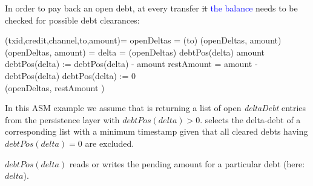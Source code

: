 In order to pay back an open debt, at every transfer \st{it} \textcolor{blue}{the balance} needs to be checked for possible debt clearances:

\begin{asm}
	(txid,credit,channel,to,amount)=\+
		\LET openDeltas = (to)\+
			(openDeltas, amount)\dec\-
	\WHERE \+
		(openDeltas, amount) =\+
		\LET delta = (openDeltas)\+
			\IF debtPos(delta) \ge amount \THEN\+
				debtPos(delta) := debtPos(delta) - amount\-
			\ELSE\+
				\LET restAmount = amount - debtPos(delta)\+
					debtPos(delta) := 0\SEQ\\
					(openDeltas, restAmount )\dec\dec\dec\-
\end{asm}


In this ASM example we assume that  is returning a list of open \textit{deltaDebt} entries from the persistence layer with $debtPos(delta)>0$.  selects the delta-debt of a corresponding list with a minimum timestamp given that all cleared debts having $debtPos(delta)=0$ are excluded.

$debtPos(delta)$ reads or writes the pending amount for a particular debt (here: $delta$).









